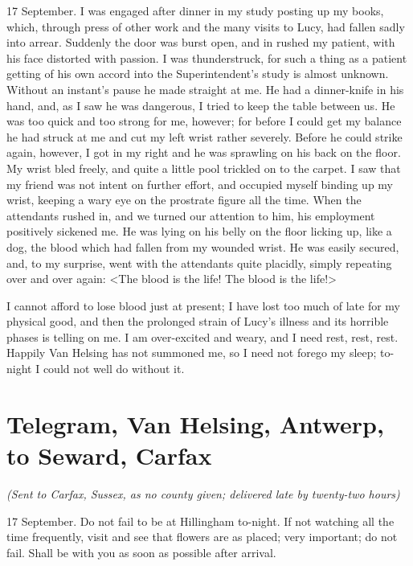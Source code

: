 \begin{diary}{17 September.}
I was engaged after dinner in my study posting up my books, which, through press of other work and the many visits to Lucy, had fallen sadly into arrear. Suddenly the door was burst open, and in rushed my patient, with his face distorted with passion. I was thunderstruck, for such a thing as a patient getting of his own accord into the Superintendent's study is almost unknown. Without an instant's pause he made straight at me. He had a dinner-knife in his hand, and, as I saw he was dangerous, I tried to keep the table between us. He was too quick and too strong for me, however; for before I could get my balance he had struck at me and cut my left wrist rather severely. Before he could strike again, however, I got in my right and he was sprawling on his back on the floor. My wrist bled freely, and quite a little pool trickled on to the carpet. I saw that my friend was not intent on further effort, and occupied myself binding up my wrist, keeping a wary eye on the prostrate figure all the time. When the attendants rushed in, and we turned our attention to him, his employment positively sickened me. He was lying on his belly on the floor licking up, like a dog, the blood which had fallen from my wounded wrist. He was easily secured, and, to my surprise, went with the attendants quite placidly, simply repeating over and over again: <The blood is the life! The blood is the life!>

I cannot afford to lose blood just at present; I have lost too much of late for my physical good, and then the prolonged strain of Lucy's illness and its horrible phases is telling on me. I am over-excited and weary, and I need rest, rest, rest. Happily Van Helsing has not summoned me, so I need not forego my sleep; to-night I could not well do without it.
\end{diary}

\section{Telegram, Van Helsing, Antwerp, to Seward, Carfax}
	\begin{center}\itshape(Sent to Carfax, Sussex, as no county given; delivered late by twenty-two hours)\end{center}

\begin{telegram}{17 September.}
Do not fail to be at Hillingham to-night. If not watching all the time frequently, visit and see that flowers are as placed; very important; do not fail. Shall be with you as soon as possible after arrival.
\end{telegram}

